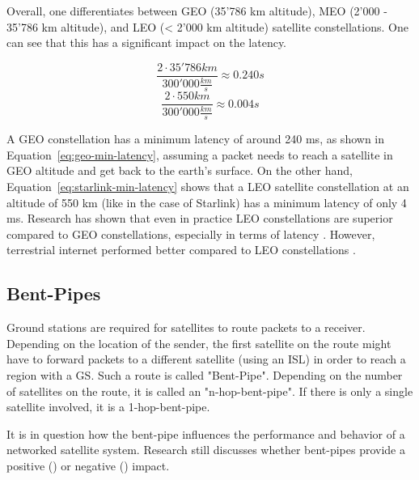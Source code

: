 Overall, one differentiates between \ac{GEO} (35'786 km altitude), \ac{MEO}
(2'000 - 35'786 km altitude), and \ac{LEO} (< 2'000 km altitude) satellite
constellations. One can see that this has a significant impact on the latency.

\begin{equation}
	\frac{2 \cdot 35'786 km}{300'000 \frac{km}{s}} \approx 0.240 s
	\label{eq:geo-min-latency}
\end{equation}
\begin{equation}
	\frac{2 \cdot 550 km}{300'000 \frac{km}{s}} \approx 0.004 s
	\label{eq:starlink-min-latency}
\end{equation}

A \ac{GEO} constellation has a minimum latency of around 240 ms, as shown in
Equation~\ref{eq:geo-min-latency}, assuming a packet needs to reach a satellite
in GEO altitude and get back to the earth's surface. On the other hand,
Equation~\ref{eq:starlink-min-latency} shows that a \ac{LEO} satellite
constellation at an altitude of 550 km (like in the case of Starlink) has a
minimum latency of only 4 ms. Research has shown that even in practice \ac{LEO}
constellations are superior compared to \ac{GEO} constellations, especially in
terms of latency \cite{DBLP:journals/pacmnet/RamanVCSZ23, Segan2020}. However,
terrestrial internet performed better compared to \ac{LEO} constellations
\cite{DBLP:conf/www/MohanFCBRMO24, DBLP:conf/infocom/MaCZCML23}.

\subsection{Bent-Pipes} \label{sec:bent-pipes}

Ground stations are required for satellites to route packets to a receiver.
Depending on the location of the sender, the first satellite on the route might
have to forward packets to a different satellite (using an \ac{ISL}) in order
to reach a region with a \ac{GS}. Such a route is called "Bent-Pipe". Depending
on the number of satellites on the route, it is called an "n-hop-bent-pipe". If
there is only a single satellite involved, it is a 1-hop-bent-pipe.

It is in question how the bent-pipe influences the performance and behavior of
a networked satellite system. Research still discusses whether bent-pipes
provide a positive (\cite{Hauri2020}) or negative
(\cite{DBLP:conf/www/MohanFCBRMO24}) impact.

